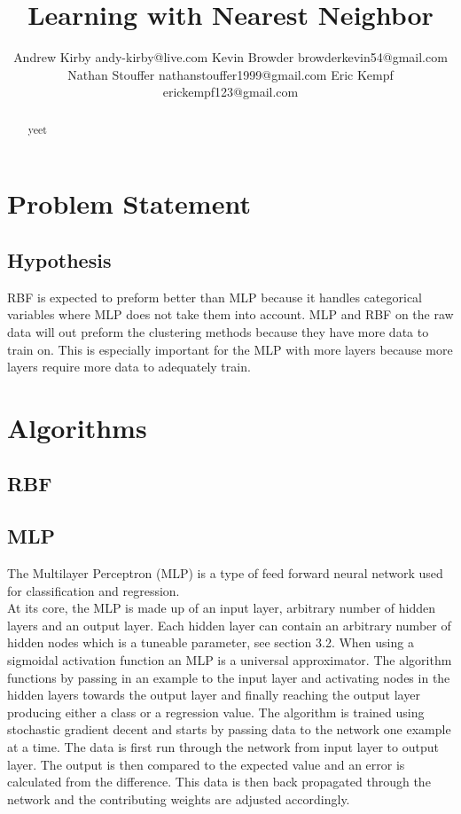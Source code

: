 \documentclass[twoside,11pt]{article}
\begin{document}
\title{Learning with Nearest Neighbor}

\author{\name Andrew Kirby \email andy-kirby@live.com \AND
		\name Kevin Browder \email browderkevin54@gmail.com \AND
		\name Nathan Stouffer \email nathanstouffer1999@gmail.com \AND
		\name Eric Kempf \email erickempf123@gmail.com }

\maketitle

\begin{abstract}
yeet
\end{abstract}

\section{Problem Statement}

\subsection*{Hypothesis}
RBF is expected to preform better than MLP because it handles categorical variables where MLP does not take them into account. MLP and RBF on the raw data will out preform the clustering methods because they have more data to train on. This is especially important for the MLP with more layers because more layers require more data to adequately train.
\section{Algorithms}
\subsection{RBF}

\subsection{MLP}
The Multilayer Perceptron (MLP) is a type of feed forward neural network used for classification and regression. \\
\indent At its core, the MLP is made up of an input layer, arbitrary number of hidden layers and an output layer. Each hidden layer can contain an arbitrary number of hidden nodes which is a tuneable parameter, see section 3.2.  When using a sigmoidal activation function an MLP is a universal approximator. The algorithm functions by passing in an example to the input layer and activating nodes in the hidden layers towards the output layer and finally reaching the output layer producing either a class or a regression value. The algorithm is trained using stochastic gradient decent and starts by passing data to the network one example at a time. The data is first run through the network from input layer to output layer. The output is then compared to the expected value and an error is calculated from the difference. This data is then back propagated through the network and the contributing weights are adjusted accordingly. 
\end{document}
